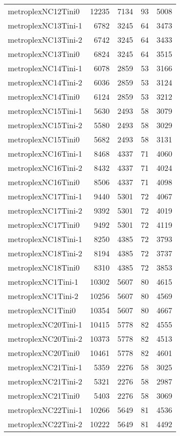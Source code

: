 \begin{longtable}{lrrrr}
metroplexNC12Tini0 & 12235 & 7134 & 93 & 5008 \\
metroplexNC13Tini-1 & 6782 & 3245 & 64 & 3473 \\
metroplexNC13Tini-2 & 6742 & 3245 & 64 & 3433 \\
metroplexNC13Tini0 & 6824 & 3245 & 64 & 3515 \\
metroplexNC14Tini-1 & 6078 & 2859 & 53 & 3166 \\
metroplexNC14Tini-2 & 6036 & 2859 & 53 & 3124 \\
metroplexNC14Tini0 & 6124 & 2859 & 53 & 3212 \\
metroplexNC15Tini-1 & 5630 & 2493 & 58 & 3079 \\
metroplexNC15Tini-2 & 5580 & 2493 & 58 & 3029 \\
metroplexNC15Tini0 & 5682 & 2493 & 58 & 3131 \\
metroplexNC16Tini-1 & 8468 & 4337 & 71 & 4060 \\
metroplexNC16Tini-2 & 8432 & 4337 & 71 & 4024 \\
metroplexNC16Tini0 & 8506 & 4337 & 71 & 4098 \\
metroplexNC17Tini-1 & 9440 & 5301 & 72 & 4067 \\
metroplexNC17Tini-2 & 9392 & 5301 & 72 & 4019 \\
metroplexNC17Tini0 & 9492 & 5301 & 72 & 4119 \\
metroplexNC18Tini-1 & 8250 & 4385 & 72 & 3793 \\
metroplexNC18Tini-2 & 8194 & 4385 & 72 & 3737 \\
metroplexNC18Tini0 & 8310 & 4385 & 72 & 3853 \\
metroplexNC1Tini-1 & 10302 & 5607 & 80 & 4615 \\
metroplexNC1Tini-2 & 10256 & 5607 & 80 & 4569 \\
metroplexNC1Tini0 & 10354 & 5607 & 80 & 4667 \\
metroplexNC20Tini-1 & 10415 & 5778 & 82 & 4555 \\
metroplexNC20Tini-2 & 10373 & 5778 & 82 & 4513 \\
metroplexNC20Tini0 & 10461 & 5778 & 82 & 4601 \\
metroplexNC21Tini-1 & 5359 & 2276 & 58 & 3025 \\
metroplexNC21Tini-2 & 5321 & 2276 & 58 & 2987 \\
metroplexNC21Tini0 & 5403 & 2276 & 58 & 3069 \\
metroplexNC22Tini-1 & 10266 & 5649 & 81 & 4536 \\
metroplexNC22Tini-2 & 10222 & 5649 & 81 & 4492 \\

\end{longtable}
